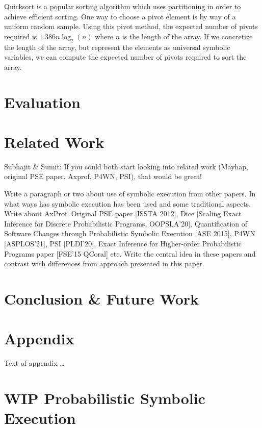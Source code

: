 \documentclass[acmsmall,review]{acmart}\settopmatter{}
\begin{document}
	Quicksort is a popular sorting algorithm which uses partitioning in order to achieve efficient sorting.
	One way to choose a pivot element is by way of a uniform random sample.
	Using this pivot method, the expected number of pivots required is $1.386 n \log_2(n)$ where $n$ is the length of the array.
	If we concretize the length of the array, but represent the elements as universal symbolic variables, we can compute the expected number of pivots required to sort the array.
	
	
	\section{Evaluation}
	\label{sec:eval}
	
	\section{Related Work}
	\label{sec:related}
	{\color{red} Subhajit \& Sumit: If you could both start looking into related work (Mayhap, original PSE paper, Axprof, P4WN, PSI), that would be great!}
	
	{\color{blue}
		Write a paragraph or two about use of symbolic execution from other papers. In what ways has symbolic execution has been used and some traditional aspects.
		Write about AxProf, Original PSE paper [ISSTA 2012], Dice [Scaling Exact Inference for Discrete Probabilistic Programs, OOPSLA'20], Quantification of Software Changes through Probabilistic Symbolic Execution [ASE 2015], P4WN [ASPLOS'21], PSI [PLDI'20], Exact Inference for Higher-order Probabilistic Programs paper [FSE'15 QCoral] etc. Write the central idea in these papers and contrast with differences from approach presented in this paper. 
	}
	\section{Conclusion \& Future Work}
	\label{sec:conclusion}
	
	
	\begin{acks}                            %
	\end{acks}
	
	
	
	
	
	\appendix
	\section{Appendix}
	
	Text of appendix \ldots
	
	\section{WIP Probabilistic Symbolic Execution} 
	
	
\end{document}
